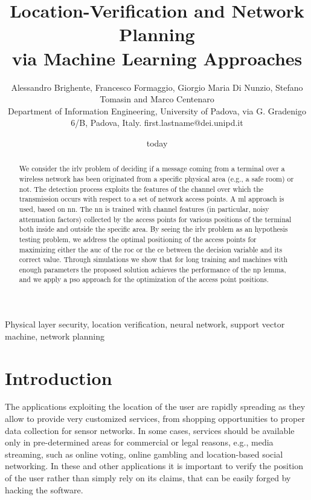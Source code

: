 \documentclass[conference]{IEEEtran}
\title{Location-Verification and Network Planning \\ via Machine Learning Approaches}
\author{Alessandro Brighente, Francesco Formaggio, Giorgio Maria Di Nunzio,  Stefano Tomasin and Marco Centenaro  \\ {\small Department of Information Engineering, University of Padova, via G. Gradenigo 6/B, Padova, Italy. first.lastname@dei.unipd.it} }
\date{today}
\begin{document}
\maketitle

\begin{abstract}
We consider the \ac{irlv} problem of deciding if a message coming from a terminal over a wireless network has been originated from a specific physical area (e.g., a safe room) or not. The detection process exploits the features of the channel over which the transmission occurs with respect to a set of network access points. A  \ac{ml} approach is used, based on \ac{nn}. The \ac{nn} is trained with channel features (in particular, noisy attenuation factors) collected by the access points for various positions of the terminal both inside and outside the specific area. By seeing the \ac{irlv} problem as an hypothesis testing problem, we address the optimal positioning of the access points for maximizing either the \ac{auc} of the \ac{roc} or  the \ac{ce} between the decision variable and its correct value. Through simulations we show that for long training and machines with enough parameters the proposed solution achieves the performance of the \ac{np} lemma, and we apply a \ac{pso} approach for the optimization of the access point positions.
\end{abstract}

\begin{IEEEkeywords}
Physical layer security, location verification, neural network, support vector machine, network planning
\end{IEEEkeywords}
\glsresetall

\section{Introduction}

The applications exploiting the location of the user are rapidly spreading as they allow to provide very customized services, from shopping opportunities to proper data collection for sensor networks. In some cases, services should be available only in pre-determined areas for commercial or legal reasons, e.g., media streaming, such as online voting, online gambling and location-based social networking. In these and other applications it is important to verify the position of the user rather than simply rely on its claims, that can be easily forged by hacking the software.
\end{document}
